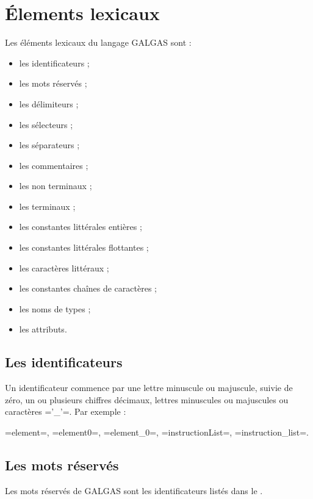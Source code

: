 
\chapter{Élements lexicaux}

Les éléments lexicaux du langage GALGAS sont :
\begin{itemize}
  \item les identificateurs ;
  \item les mots réservés ;
  \item les délimiteurs ;
  \item les sélecteurs ;
  \item les séparateurs ;
  \item les commentaires ;
  \item les non terminaux ;
  \item les terminaux ;
  \item les constantes littérales entières ;
  \item les constantes littérales flottantes ;
  \item les caractères littéraux  ;
  \item les constantes chaînes de caractères ;
  \item les noms de types ;
  \item les attributs.
\end{itemize}


\section{Les identificateurs}

Un identificateur commence par une lettre minuscule ou majuscule, suivie de zéro, un ou plusieurs chiffres décimaux, lettres minuscules ou majuscules ou caractères \ggs='_'=. Par exemple :

\ggs=element=, \ggs=element0=, \ggs=element_0=, \ggs=instructionList=, \ggs=instruction_list=.

\section{Les mots réservés}

Les mots réservés de GALGAS sont les identificateurs listés dans le .

